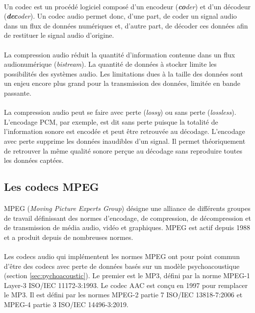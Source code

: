 \documentclass{article}
\begin{document}
    \paragraph{}
    Un codec est un procédé logiciel composé d'un encodeur (\emph{\textbf{co}der}) et d'un décodeur (\emph{\textbf{dec}oder})\cite{wiki:codec}. Un codec audio permet donc, d'une part, de coder un signal audio dans un flux de données numériques et, d'autre part, de décoder ces données afin de restituer le signal audio d'origine.

    \paragraph{}
    La compression audio réduit la quantité d'information contenue dans un flux audionumérique (\emph{bistream}). La quantité de données à stocker limite les possibilités des systèmes audio. Les limitations dues à la taille des données sont un enjeu encore plus grand pour la transmission des données, limitée en bande passante\cite{2005-embrechts}.

    \paragraph{}
    La compression audio peut se faire avec perte (\emph{lossy}) ou sans perte (\emph{lossless}). L'encodage PCM, par exemple, est dit sans perte puisque la totalité de l'information sonore est encodée et peut être retrouvée au décodage. L'encodage avec perte supprime les données inaudibles d'un signal. Il permet théoriquement de retrouver la même qualité sonore perçue au décodage sans reproduire toutes les données captées.


    \subsection{Les codecs MPEG}
    \paragraph{}
    MPEG (\emph{Moving Picture Experts Group}) désigne une alliance de différents groupes de travail définissant des normes d'encodage, de compression, de décompression et de transmission de média audio, vidéo et graphiques\cite{wiki:MPEG}. MPEG est actif depuis 1988 et a produit depuis de nombreuses normes.

    \paragraph{}
    Les codecs audio qui implémentent les normes MPEG ont pour point commun d'être des codecs avec perte de données basés sur un modèle psychoacoustique (section \ref{sec:pychoacoustic}). Le premier est le MP3, défini par la norme MPEG-1 Layer-3 ISO/IEC 11172-3:1993. Le codec AAC est conçu en 1997 pour remplacer le MP3\cite{wiki:AAC}. Il est défini par les normes MPEG-2 partie 7 ISO/IEC 13818-7:2006\cite{ISO13818-7} et MPEG-4 partie 3 ISO/IEC 14496-3:2019\cite{ISO14496-3}.
\end{document}

